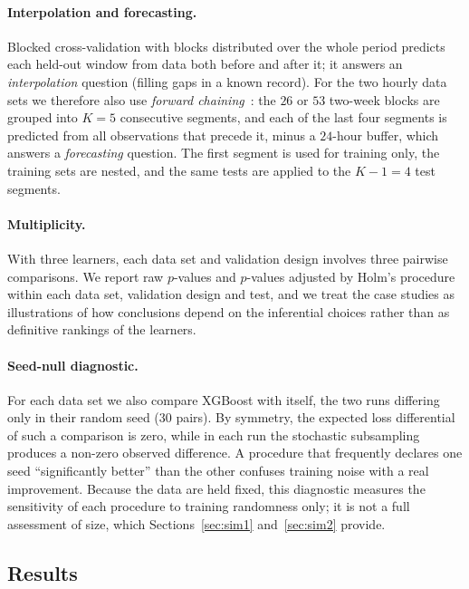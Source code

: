 \paragraph{Interpolation and forecasting.} Blocked cross-validation with blocks distributed over the whole period predicts each held-out window from data both before and after it; it answers an \emph{interpolation} question (filling gaps in a known record). For the two hourly data sets we therefore also use \emph{forward chaining}~\cite{tashman2000}: the $26$ or $53$ two-week blocks are grouped into $K=5$ consecutive segments, and each of the last four segments is predicted from all observations that precede it, minus a $24$-hour buffer, which answers a \emph{forecasting} question. The first segment is used for training only, the training sets are nested, and the same tests are applied to the $K-1=4$ test segments.

\paragraph{Multiplicity.} With three learners, each data set and validation design involves three pairwise comparisons. We report raw $p$-values and $p$-values adjusted by Holm's procedure~\cite{holm1979} within each data set, validation design and test, and we treat the case studies as illustrations of how conclusions depend on the inferential choices rather than as definitive rankings of the learners.

\paragraph{Seed-null diagnostic.} For each data set we also compare XGBoost with itself, the two runs differing only in their random seed ($30$ pairs). By symmetry, the expected loss differential of such a comparison is zero, while in each run the stochastic subsampling produces a non-zero observed difference. A procedure that frequently declares one seed ``significantly better'' than the other confuses training noise with a real improvement. Because the data are held fixed, this diagnostic measures the sensitivity of each procedure to training randomness only; it is not a full assessment of size, which Sections~\ref{sec:sim1} and~\ref{sec:sim2} provide.

\subsection{Results}

